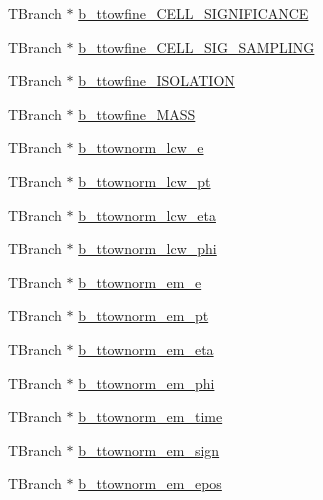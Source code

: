 \begin{DoxyCompactItemize}
\item 
T\+Branch $\ast$ \hyperlink{classJetAnalysisExample_a2bade03f8e2731844b1a82b50e7deaf3}{b\+\_\+ttowfine\+\_\+\+C\+E\+L\+L\+\_\+\+S\+I\+G\+N\+I\+F\+I\+C\+A\+N\+CE}
\item 
T\+Branch $\ast$ \hyperlink{classJetAnalysisExample_a90d03af66faf6c81950ccceddc89c615}{b\+\_\+ttowfine\+\_\+\+C\+E\+L\+L\+\_\+\+S\+I\+G\+\_\+\+S\+A\+M\+P\+L\+I\+NG}
\item 
T\+Branch $\ast$ \hyperlink{classJetAnalysisExample_a07a6fcb53fd5662416f17bd2a0cb878f}{b\+\_\+ttowfine\+\_\+\+I\+S\+O\+L\+A\+T\+I\+ON}
\item 
T\+Branch $\ast$ \hyperlink{classJetAnalysisExample_ab26d475a665b1227da9aa9b8a9f37224}{b\+\_\+ttowfine\+\_\+\+M\+A\+SS}
\item 
T\+Branch $\ast$ \hyperlink{classJetAnalysisExample_af6fb4f4d0e9a6d943f156245f0e2be72}{b\+\_\+ttownorm\+\_\+lcw\+\_\+e}
\item 
T\+Branch $\ast$ \hyperlink{classJetAnalysisExample_a9dcf161b4f0a37c1303dd5d8fa13098f}{b\+\_\+ttownorm\+\_\+lcw\+\_\+pt}
\item 
T\+Branch $\ast$ \hyperlink{classJetAnalysisExample_a44070bcff80e6d6cca30eef77e35df6c}{b\+\_\+ttownorm\+\_\+lcw\+\_\+eta}
\item 
T\+Branch $\ast$ \hyperlink{classJetAnalysisExample_a2535a9d8263c82e624b48c181411b3d4}{b\+\_\+ttownorm\+\_\+lcw\+\_\+phi}
\item 
T\+Branch $\ast$ \hyperlink{classJetAnalysisExample_a774ea1ffa615ef9c369ab2300021e2a4}{b\+\_\+ttownorm\+\_\+em\+\_\+e}
\item 
T\+Branch $\ast$ \hyperlink{classJetAnalysisExample_a46a10768b325390ddaa5dbb51d519622}{b\+\_\+ttownorm\+\_\+em\+\_\+pt}
\item 
T\+Branch $\ast$ \hyperlink{classJetAnalysisExample_a28993c614ff1f665a4f14211371af0a8}{b\+\_\+ttownorm\+\_\+em\+\_\+eta}
\item 
T\+Branch $\ast$ \hyperlink{classJetAnalysisExample_adc05a9d4cbd72f936cee657723b4cada}{b\+\_\+ttownorm\+\_\+em\+\_\+phi}
\item 
T\+Branch $\ast$ \hyperlink{classJetAnalysisExample_acd245fcb9e138224cdfff8c12d1b056f}{b\+\_\+ttownorm\+\_\+em\+\_\+time}
\item 
T\+Branch $\ast$ \hyperlink{classJetAnalysisExample_a4b147607a796930cd869673fe4a8d7c2}{b\+\_\+ttownorm\+\_\+em\+\_\+sign}
\item 
T\+Branch $\ast$ \hyperlink{classJetAnalysisExample_a9e1596b6f8af64a2fbbd8421b0a0253d}{b\+\_\+ttownorm\+\_\+em\+\_\+epos}

\end{DoxyCompactItemize}
